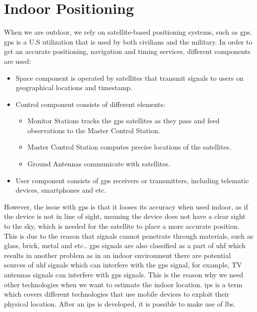 \section{Indoor Positioning}
When we are outdoor, we rely on satellite-based positioning systems, such as \gls{gps}. \gls{gps} is a U.S utilization that is used by both civilians and the military. In order to get an accurate positioning, navigation and timing services, different components are used: \cite{GPSofficial}

\begin{itemize}
    \item Space component is operated by satellites that transmit signals to users on geographical locations and timestamp. 
    \item Control component consists of different elements: 
    \begin{itemize}
        \item Monitor Stations tracks the \gls{gps} satellites as they pass and feed observations to the Master Control Station. 
        \item Master Control Station computes precise locations of the satellites.
        \item Ground Antennas communicate with satellites. 
    \end{itemize}
    \item User component consists of \gls{gps} receivers or transmitters, including telematic devices, smartphones and etc. 
\end{itemize}

However, the issue with \gls{gps} is that it looses its accuracy when used indoor, as if the device is not in line of sight, meaning the device does not have a clear sight to the sky, which is needed for the satellite to place a more accurate position\cite{GPSofficial}. This is due to the reason that signals cannot penetrate through materials, such as glass, brick, metal and etc.\cite{GPSofficial}. \gls{gps} signals are also classified as a part of \gls{uhf} which results in another problem as in an indoor environment there are potential sources of \gls{uhf} signals which can interfere with the \gls{gps} signal, for example, TV antennas signals can interfere with \gls{gps} signals\cite{GPSofficial}.
This is the reason why we need other technologies when we want to estimate the indoor location. \gls{ips} is a term which covers different technologies that use mobile devices to exploit their physical location. After an \gls{ips} is developed, it is possible to make use of \gls{lbs}.

